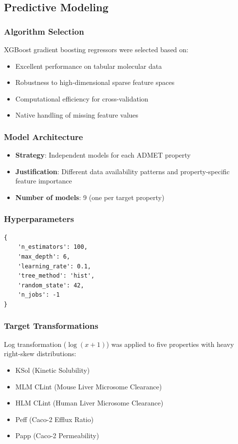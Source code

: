 \documentclass[11pt,a4paper]{article}
\newcommand{\xgb}{XGBoost}
\newcommand{\admet}{ADMET}
\begin{document}
\subsection{Predictive Modeling}

\subsubsection{Algorithm Selection}

\xgb{} gradient boosting regressors were selected based on:
\begin{itemize}
    \item Excellent performance on tabular molecular data
    \item Robustness to high-dimensional sparse feature spaces
    \item Computational efficiency for cross-validation
    \item Native handling of missing feature values
\end{itemize}

\subsubsection{Model Architecture}

\begin{itemize}
    \item \textbf{Strategy}: Independent models for each \admet{} property
    \item \textbf{Justification}: Different data availability patterns and property-specific feature importance
    \item \textbf{Number of models}: 9 (one per target property)
\end{itemize}

\subsubsection{Hyperparameters}

\begin{verbatim}
{
    'n_estimators': 100,
    'max_depth': 6,
    'learning_rate': 0.1,
    'tree_method': 'hist',
    'random_state': 42,
    'n_jobs': -1
}
\end{verbatim}

\subsubsection{Target Transformations}

Log transformation ($\log(x + 1)$) was applied to five properties with heavy right-skew distributions:
\begin{itemize}
    \item KSol (Kinetic Solubility)
    \item MLM CLint (Mouse Liver Microsome Clearance)
    \item HLM CLint (Human Liver Microsome Clearance)
    \item Peff (Caco-2 Efflux Ratio)
    \item Papp (Caco-2 Permeability)
\end{itemize}
\end{document}
